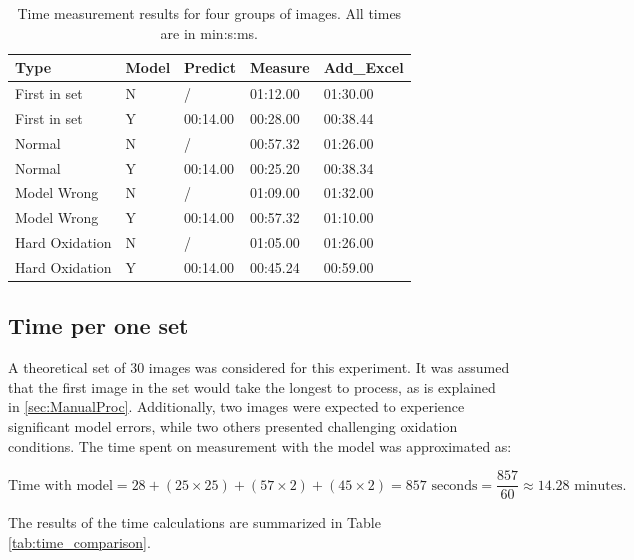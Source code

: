 \begin{table}[H]
    \centering
    \caption{Time measurement results for four groups of images. All times are in min:s:ms.}

    \begin{tabular}{lllll}
        \toprule
        \textbf{Type} & \textbf{Model} & \textbf{Predict} & \textbf{Measure} & \textbf{Add\_Excel} \\
        \midrule
        First in set   & N & /         & 01:12.00 & 01:30.00 \\
        First in set   & Y & 00:14.00  & 00:28.00 & 00:38.44 \\
        Normal         & N & /         & 00:57.32 & 01:26.00 \\
        Normal         & Y & 00:14.00  & 00:25.20 & 00:38.34 \\
        Model Wrong    & N & /         & 01:09.00 & 01:32.00 \\
        Model Wrong    & Y & 00:14.00  & 00:57.32 & 01:10.00 \\
        Hard Oxidation & N & /         & 01:05.00 & 01:26.00 \\
        Hard Oxidation & Y & 00:14.00  & 00:45.24 & 00:59.00 \\
        \bottomrule
    \end{tabular}
    \label{tab:time-measurements}
\end{table}



\subsection{Time per one set}

A theoretical set of 30 images was considered for this experiment. It was assumed that the first image in the set would take the longest to process, as is explained in \ref{sec:ManualProc}. Additionally, two images were expected to experience significant model errors, while two others presented challenging oxidation conditions. The time spent on measurement with the model was approximated as:

\[
\text{Time with model} = 28 + (25 \times 25) + (57 \times 2) + (45 \times 2) = 857 \text{ seconds} = \frac{857}{60} \approx 14.28 \text{ minutes}.
\]

The results of the time calculations are summarized in Table \ref{tab:time_comparison}.


